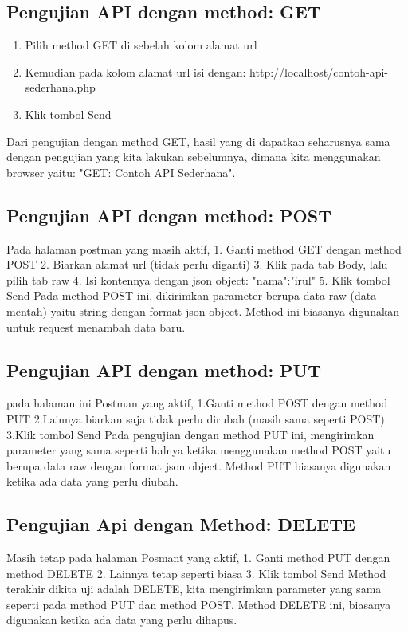 \documentclass[12pt,a4paper]{article}
\begin{document}
\subsection{Pengujian API dengan method: GET}
\begin{enumerate}
\item Pilih method GET di sebelah kolom alamat url
\item Kemudian pada kolom alamat url isi dengan: http://localhost/contoh-api-sederhana.php
\item Klik tombol Send
\end{enumerate}
Dari pengujian dengan method GET, hasil yang di dapatkan seharusnya sama dengan pengujian yang kita lakukan sebelumnya, dimana kita menggunakan browser yaitu: "GET: Contoh API Sederhana".

\subsection{Pengujian API dengan method: POST}
Pada halaman postman yang masih aktif,
1. Ganti method GET dengan method POST
2. Biarkan alamat url (tidak perlu diganti)
3. Klik pada tab Body, lalu pilih tab raw
4. Isi kontennya dengan json object: {"nama":"irul"}
5. Klik tombol Send
Pada method POST ini, dikirimkan  parameter berupa data raw (data mentah) yaitu string dengan format json object. Method ini biasanya digunakan untuk request menambah data baru. 

\subsection{Pengujian API dengan method: PUT}
pada halaman ini Postman yang aktif,
1.Ganti method POST dengan method PUT
2.Lainnya biarkan saja tidak perlu dirubah (masih sama seperti POST)
3.Klik tombol Send
Pada pengujian dengan method PUT ini, mengirimkan parameter yang sama seperti halnya ketika menggunakan method POST yaitu berupa data raw dengan format json object. Method PUT biasanya digunakan ketika ada data yang perlu diubah. 

\subsection{Pengujian Api dengan Method: DELETE}
Masih tetap pada halaman Posmant yang aktif,
1. Ganti method PUT dengan method DELETE
2. Lainnya tetap seperti biasa 
3. Klik tombol Send
Method terakhir dikita uji adalah DELETE, kita mengirimkan parameter yang sama seperti pada method PUT dan method POST. Method DELETE ini, biasanya digunakan ketika ada data yang perlu dihapus.
\end{document}
